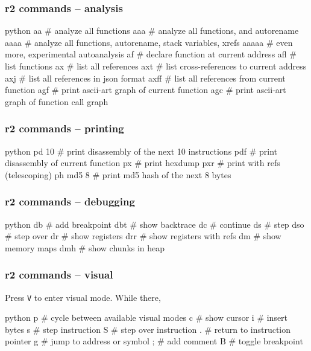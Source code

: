 \documentclass[aspectratio=169]{beamer}
\begin{document}
\begin{frame}[fragile]
	\frametitle{r2 commands -- analysis}
	\begin{codebox}{python}
aa       # analyze all functions
aaa      # analyze all functions, and autorename
aaaa     # analyze all functions, autorename, stack variables, xrefs
aaaaa    # even more, experimental autoanalysis
af       # declare function at current address 
afl      # list functions
ax       # list all references
axt      # list cross-references to current address
axj      # list all references in json format
axff     # list all references from current function
agf      # print ascii-art graph of current function
agc      # print ascii-art graph of function call graph\end{codebox}
\end{frame}


\begin{frame}[fragile]
	\frametitle{r2 commands -- printing}
	\begin{codebox}{python}
pd 10    # print disassembly of the next 10 instructions
pdf      # print disassembly of current function
px       # print hexdump
pxr      # print with refs (telescoping)
ph md5 8 # print md5 hash of the next 8 bytes\end{codebox}
\end{frame}


\begin{frame}[fragile]
	\frametitle{r2 commands -- debugging}
	\begin{codebox}{python}
db       # add breakpoint
dbt      # show backtrace
dc       # continue
ds       # step
dso      # step over
dr       # show registers
drr      # show registers with refs
dm       # show memory maps
dmh      # show chunks in heap\end{codebox}
\end{frame}


\begin{frame}[fragile]
	\frametitle{r2 commands -- visual}
	Press \texttt{V} to enter visual mode. While there,
	\begin{codebox}{python}
p        # cycle between available visual modes
c        # show cursor
i        # insert bytes
s        # step instruction
S        # step over instruction
.        # return to instruction pointer
g        # jump to address or symbol
;        # add comment
B        # toggle breakpoint\end{codebox}
\end{frame}
\end{document}

